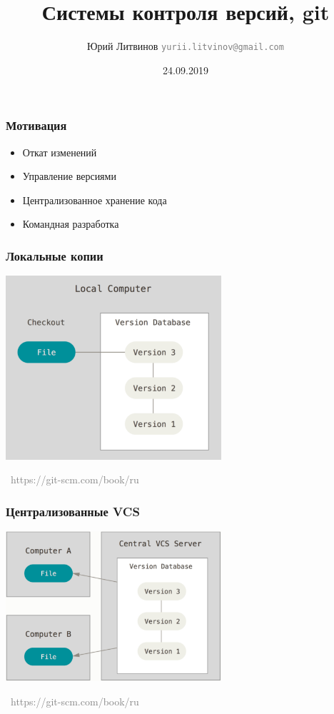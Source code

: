 \documentclass[xetex,mathserif,serif]{beamer}
\title{Системы контроля версий, git}
\author[Юрий Литвинов]{Юрий Литвинов \newline \textcolor{gray}{\small\texttt{yurii.litvinov@gmail.com}}}
\date{24.09.2019}
\newcommand{\attribution}[1] {
	\vspace{-5mm}\begin{flushright}\begin{scriptsize}\textcolor{gray}{\textcopyright\, #1}\end{scriptsize}\end{flushright}
}
\begin{document}
	
	\frame{\titlepage}
	
	\begin{frame}
		\frametitle{Мотивация}
		\begin{itemize}
			\item Откат изменений
			\item Управление версиями
			\item Централизованное хранение кода
			\item Командная разработка
		\end{itemize}
	\end{frame}

	\begin{frame}
		\frametitle{Локальные копии}
		\begin{center}
			\includegraphics[width=0.6\textwidth]{localCopies.png}
			\attribution{https://git-scm.com/book/ru}
		\end{center}
	\end{frame}

	\begin{frame}
		\frametitle{Централизованные VCS}
		\begin{center}
			\includegraphics[width=0.6\textwidth]{centralizedVcs.png}
			\attribution{https://git-scm.com/book/ru}
		\end{center}
	\end{frame}
\end{document}
